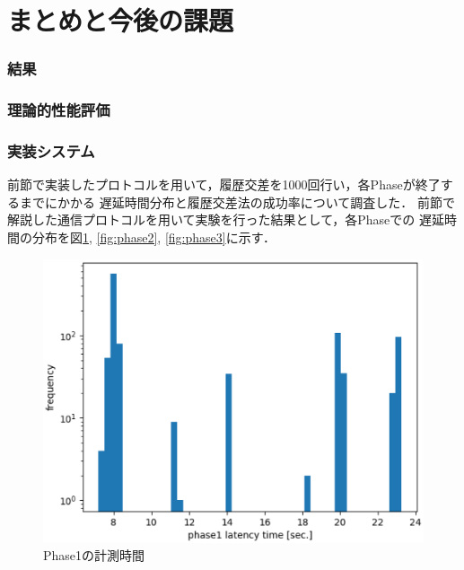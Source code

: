 \documentclass[a4paper,12pt]{jsarticle}
\begin{document}
\newpage
\section{まとめと今後の課題}
\subsubsection{結果}
\subsubsection{理論的性能評価}
\subsubsection{実装システム}
前節で実装したプロトコルを用いて，履歴交差を1000回行い，各Phaseが終了するまでにかかる
遅延時間分布と履歴交差法の成功率について調査した．
前節で解説した通信プロトコルを用いて実験を行った結果として，各Phaseでの
遅延時間の分布を図\ref{fig:phase1}, \ref{fig:phase2}, \ref{fig:phase3}に示す．
%
\begin{figure}[tbh]
  \begin{center}
    \includegraphics{pht/phase1-sec-hist.eps}
  \end{center}
  \caption{Phase1の計測時間}
  \label{fig:phase1}
\end{figure}
%
%
\end{document}
